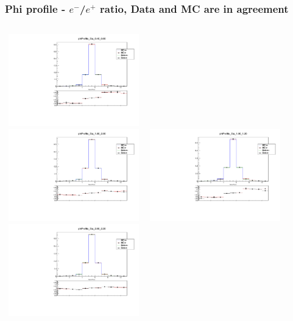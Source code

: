 \documentclass{beamer}
\begin{document}
\begin{frame}
\frametitle{Phi profile - $e^-$/$e^+$ ratio, Data and MC are in agreement}

\begin{columns}[t]
\centering
\includegraphics[width=6cm,height=4cm]{phiProfileDataMC_Eta_4_6.pdf}\\
\includegraphics[width=6cm,height=4cm]{phiProfileDataMC_Eta_18_20.pdf}
\centering
\includegraphics[width=6cm,height=4cm]{phiProfileDataMC_Eta_10_12.pdf}\\
\includegraphics[width=6cm,height=4cm]{phiProfileDataMC_Eta_20_22.pdf}
\end{columns}
\end{frame}
\end{document}

